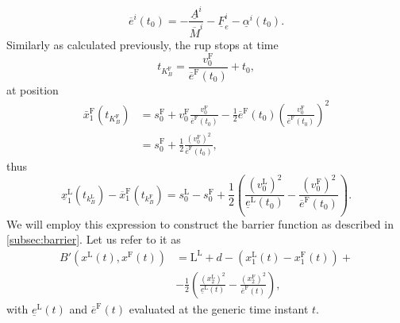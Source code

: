 \begin{equation*}
	\overline{e}^i\left(t_0\right) = - \frac{\underline{A}^i}{\overline{M}^i}  - \underline{F}_e^i  - \underline{\alpha}^i\left(t_0\right).
\end{equation*}
%
Similarly as calculated previously, the \gls{rup} stops at time
%
\begin{equation*}
	t_{K_B^\mathrm{F}} = \frac{v_0^\mathrm{F}}{\overline{e}^\mathrm{F}\left(t_0\right)} + t_0,
\end{equation*}
%
at position
%
\begin{equation*}
	\begin{aligned}
		\bar{x}_1^\mathrm{F}\left(t_{K_B^\mathrm{F}}\right) & =s_0^\mathrm{F}+v_0^\mathrm{F} \frac{v_0^\mathrm{F}}{\overline{e}^\mathrm{F}\left(t_0\right)}-\frac{1}{2} \overline{e}^\mathrm{F}\left(t_0\right)\left(\frac{v_0^\mathrm{F}}{\overline{e}^\mathrm{F}\left(t_0\right)}\right)^2 \\
		& =s_0^\mathrm{F}+\frac{1}{2} \frac{\left(v_0^\mathrm{F}\right)^2}{\overline{e}^\mathrm{F}\left(t_0\right)},
	\end{aligned}
\end{equation*}
%
thus
%
\begin{equation*}
	\underline{x}_1^\mathrm{L}\left(t_{k_B^\mathrm{L}}\right)-\overline{x}_1^\mathrm{F}\left(t_{k_B^\mathrm{F}}\right)=s_0^\mathrm{L}-s_0^\mathrm{F}+\frac{1}{2}\left(\frac{\left(v_0^\mathrm{L}\right)^2}{\underline{e}^\mathrm{L}\left(t_0\right)}-\frac{\left(v_0^\mathrm{F}\right)^2}{\overline{e}^\mathrm{F}\left(t_0\right)}\right).
\end{equation*}
%
We will employ this expression to construct the barrier function as described in \ref{subsec:barrier}. Let us refer to it as
%
\begin{equation} \label{eq:Bprime}
	\begin{aligned}
		B'\left(x^\mathrm{L}\left(t\right),x^\mathrm{F}\left(t\right)\right)&= \mathrm{L}^\mathrm{L} + d - \left(x_1^\mathrm{L}\left(t\right)-x_1^\mathrm{F}\left(t\right)\right) + \\
		& -\frac{1}{2}\left(\frac{\left(x_2^\mathrm{L}\right)^2}{\underline{e}^\mathrm{L}\left(t\right)}-\frac{\left(x_2^\mathrm{F}\right)^2}{\overline{e}^\mathrm{F}\left(t\right)}\right),
	\end{aligned}
\end{equation}
%
with $\underline{e}^\mathrm{L}\left(t\right)$ and $\overline{e}^\mathrm{F}\left(t\right)$ evaluated at the generic time instant $t$. 

